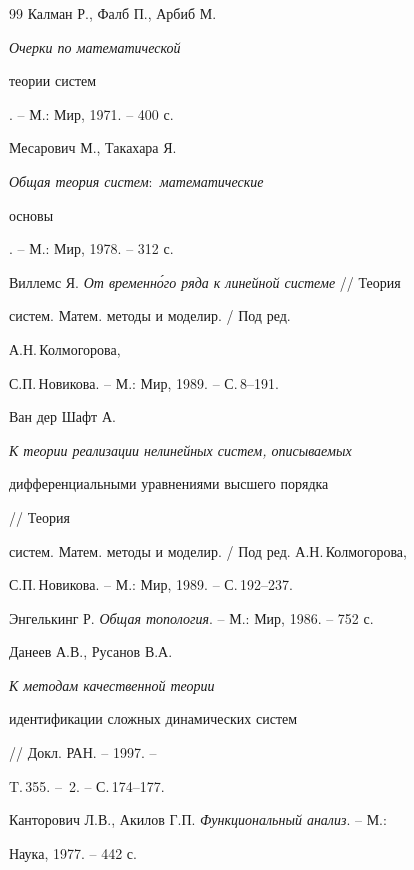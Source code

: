 \begin{thebibliography}{99}
Калман Р., Фалб П., Арбиб М. {\em Очерки по математической 


теории систем}. -- М.: Мир, 1971. -- 400 с. 




Месарович М., Такахара Я. {\em Общая теория систем$:$ математические 


основы}. -- М.: Мир, 1978. -- 312 с. 




Виллемс Я. {\em От временн\'ого ряда к линейной системе} // Теория 


систем. Матем. методы и моделир. / Под ред. 


А.Н.\,Колмогорова, 


С.П.\,Новикова. -- М.: Мир, 1989. -- С.\,8--191. 




Ван дер Шафт А. {\em К теории реализации нелинейных систем, описываемых 


дифференциальными уравнениями высшего порядка} // Теория 


систем. Матем. методы и моделир. / Под ред. А.Н.\,Колмогорова, 


С.П.\,Новикова. -- М.: Мир, 1989. -- С.\,192--237. 




Энгелькинг Р. {\em Общая топология}. -- М.: Мир, 1986. -- 752 с. 




Данеев А.В., Русанов В.А. {\em К методам качественной теории 


идентификации сложных динамических систем} // Докл. РАН. -- 1997. -- 


T.\,355. -- \No\,2. -- С.\,174--177. 




Канторович Л.В., Акилов Г.П. {\em Функциональный анализ}. -- М.: 


Наука, 1977. -- 442 с. 


 


\end{thebibliography} 


 


\vskip 2cm 


 










 


\label{end} 


 


